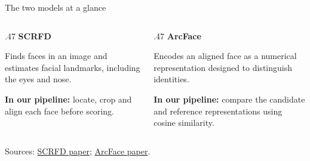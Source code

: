 \documentclass[aspectratio=169,11pt]{beamer}
\newcommand{\source}[1]{\par\vfill{\fontsize{7}{8}\selectfont\color{muted}#1\par}}
\begin{document}
\begin{frame}{The two models at a glance}
\begin{columns}[t,onlytextwidth]
\begin{column}{.47\textwidth}
\textbf{SCRFD} \par
\vspace{4mm}
Finds faces in an image and estimates facial landmarks, including the eyes and nose.\par
\vspace{4mm}
\textbf{In our pipeline:} locate, crop and align each face before scoring.
\end{column}
\begin{column}{.47\textwidth}
\textbf{ArcFace} \par
\vspace{4mm}
Encodes an aligned face as a numerical representation designed to distinguish identities.\par
\vspace{4mm}
\textbf{In our pipeline:} compare the candidate and reference representations using cosine similarity.
\end{column}
\end{columns}
\source{Sources: \href{https://arxiv.org/abs/2105.04714}{SCRFD paper}; \href{https://arxiv.org/abs/1801.07698}{ArcFace paper}.}
\end{frame}
\end{document}
